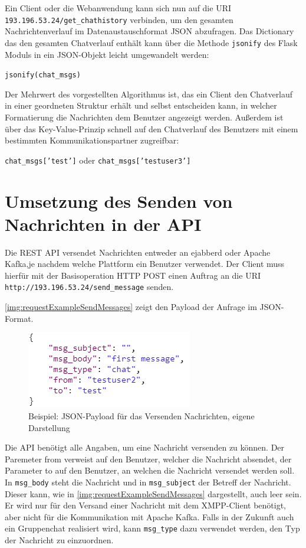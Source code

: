 \documentclass[a4paper,titlepage,halfparskip,12pt]{scrreprt}
\begin{document}
\begin{onehalfspacing}
Ein Client oder die Webanwendung kann sich nun auf die \acs{URI} \texttt{193.196.53.24/get\_chathistory} verbinden, um den gesamten Nachrichtenverlauf im Datenaustauschformat \acs{JSON} abzufragen. Das Dictionary das den gesamten Chatverlauf enthält kann über die Methode \texttt{jsonify} des Flask Moduls in ein JSON-Objekt leicht umgewandelt werden:

\texttt{jsonify(chat\_msgs)}

\pagebreak

Der Mehrwert des vorgestellten Algorithmus ist, das ein Client den Chatverlauf in einer geordneten Struktur erhält und selbst entscheiden kann, in welcher Formatierung die Nachrichten dem Benutzer angezeigt werden. Außerdem ist über das Key-Value-Prinzip schnell auf den Chatverlauf des Benutzers mit einem bestimmten Kommunikationspartner zugreifbar:

\texttt{chat\_msgs['test']} oder \texttt{chat\_msgs['testuser3']}

\pagebreak

\section{Umsetzung des Senden von Nachrichten in der \acs{API}}

Die \acs{REST} \acs{API} versendet Nachrichten entweder an ejabberd oder Apache Kafka,je nachdem welche Plattform ein Benutzer verwendet. Der Client muss hierfür mit der Basisoperation \acs{HTTP} POST einen Auftrag an die \acs{URI} \texttt{http://193.196.53.24/send\_message} senden.

\autoref{img:requestExampleSendMessages} zeigt den Payload der Anfrage im \acs{JSON}-Format.

\begin{figure}[h]
	\centering
	\includegraphics[width=.5\textwidth]{images/requestExampleSendMessages}
	\caption{Beispiel: \acs{JSON}-Payload für das Versenden Nachrichten, eigene Darstellung}
	\label{img:requestExampleSendMessages}
\end{figure}

Die \acs{API} benötigt alle Angaben, um eine Nachricht versenden zu können. Der Paremeter from verweist auf den Benutzer, welcher die Nachricht absendet, der Parameter to auf den Benutzer, an welchen die Nachricht versendet werden soll. In \texttt{msg\_body} steht die Nachricht und in \texttt{msg\_subject} der Betreff der Nachricht. Dieser kann, wie in \autoref{img:requestExampleSendMessages} dargestellt, auch leer sein. Er wird nur für den Versand einer Nachricht mit dem \acs{XMPP}-Client benötigt, aber nicht für die Kommunikation mit Apache Kafka. Falls in der Zukunft auch ein Gruppenchat realisiert wird, kann \texttt{msg\_type} dazu verwendet werden, den Typ der Nachricht zu einzuordnen.


\end{onehalfspacing}
\end{document}
